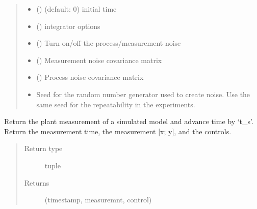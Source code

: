 \documentclass[letterpaper,10pt,english]{sphinxmanual}
\begin{document}
\begin{fulllineitems}
\begin{fulllineitems}
\begin{quote}
\begin{description}
\begin{itemize}
\item {} 
 () \textendash{} (default: 0) initial time

\item {} 
 () \textendash{} integrator options

\item {} 
 () \textendash{} Turn on/off the process/measurement noise

\item {} 
 () \textendash{} Measurement noise covariance matrix

\item {} 
 () \textendash{} Process noise covariance matrix

\item {} 
 \textendash{} Seed for the random number generator used to create noise. Use the same seed for the
repeatability in the experiments.

\end{itemize}

\end{description}\end{quote}

\end{fulllineitems}


\begin{fulllineitems}
\label{\detokenize{yaocptool.mpc:yaocptool.mpc.plant.PlantSimulation.get_measurement}}
Return the plant measurement of a simulated model and advance time by ‘t\_s’.
Return the measurement time, the measurement {[}x; y{]}, and the controls.
\begin{quote}\begin{description}
\item[{Return type}] \leavevmode
tuple

\item[{Returns}] \leavevmode
(timestamp, measuremnt, control)


\end{description}
\end{quote}
\end{fulllineitems}
\end{fulllineitems}
\end{document}
